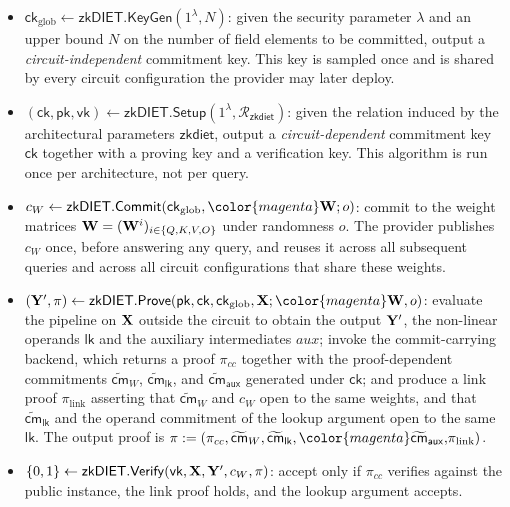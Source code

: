 \documentclass[sigconf,anonymous,review,balance=false]{acmart}
\newcommand{\rev}[1]{{\color{magenta}#1}}
\begin{document}
\begin{itemize} [leftmargin=3mm, itemsep=2pt, topsep=2pt]
  \item $\mathsf{ck}_{\mathrm{glob}} \leftarrow \mathsf{zkDIET}.\mathsf{KeyGen}(1^{\lambda}, N)$:
        given the security parameter $\lambda$ and an upper bound $N$ on the number of field elements to be committed, output a \emph{\rev{circuit-independent}} commitment key. This key is sampled once and is shared by every circuit configuration the provider may later deploy.

  \item $(\mathsf{ck}, \mathsf{pk}, \mathsf{vk}) \leftarrow
        \mathsf{zkDIET}.\mathsf{Setup}(1^{\lambda}, \mathcal{R}_{\mathsf{zkdiet}})$:
        given the relation induced by the architectural parameters $\mathsf{zkdiet}$, output a \emph{\rev{circuit-dependent}} commitment key $\mathsf{ck}$ together with a proving key and a verification key. This algorithm is run once per architecture, not per query.

  \item $c_{W} \leftarrow
        \mathsf{zkDIET}.\mathsf{Commit}(\mathsf{ck}_{\mathrm{glob}}, \rev{\W}; o)$:
        commit to the weight matrices \rev{${\mathbf{W}} = ({\mathbf{W}}^{i})_{i \in \{Q,K,V,O\}}$} under randomness $o$. The provider publishes $c_{W}$ once, before answering any query, and reuses it across all subsequent queries and across all circuit configurations that share these weights.

  \item $(\Y', \pi) \leftarrow \mathsf{zkDIET}.\mathsf{Prove} (\mathsf{pk}, \mathsf{ck}, \mathsf{ck}_{\mathrm{glob}}, \X; \rev{\W}, o)$:
        evaluate the pipeline on ${\mathbf{X}}$ outside the circuit to obtain the output ${\mathbf{Y}}'$, the non-linear operands $\mathsf{lk}$ and the auxiliary intermediates \rev{$\textit{aux}$}; invoke the commit-carrying backend, which returns a proof $\pi_{cc}$ together with the proof-dependent commitments $\widetilde{\mathsf{cm}}_{W}$, $\widetilde{\mathsf{cm}}_{\mathsf{lk}}$, and \rev{$\widetilde{\mathsf{cm}}_{\mathsf{aux}}$} generated under $\mathsf{ck}$; and produce a link proof $\pi_{\mathrm{link}}$ asserting that $\widetilde{\mathsf{cm}}_{W}$ and $c_{W}$ open to the
        same weights, and that $\widetilde{\mathsf{cm}}_{\mathsf{lk}}$ and the operand commitment of the lookup argument open to the same $\mathsf{lk}$. The output
        proof is $\pi := (\pi_{cc}, \widetilde{\mathsf{cm}}_{W}, \widetilde{\mathsf{cm}}_{\mathsf{lk}}, \rev{\widetilde{\mathsf{cm}}_{\mathsf{aux}},} \pi_{\mathrm{link}})$.

  \item $\{0,1\} \leftarrow \mathsf{zkDIET}.\mathsf{Verify}(\mathsf{vk}, {\mathbf{X}}, {\mathbf{Y}}', c_{W}, \pi)$:
        accept only if $\pi_{cc}$ verifies against the public instance, the link proof holds, and the lookup argument accepts.%
\end{itemize}
\end{document}
